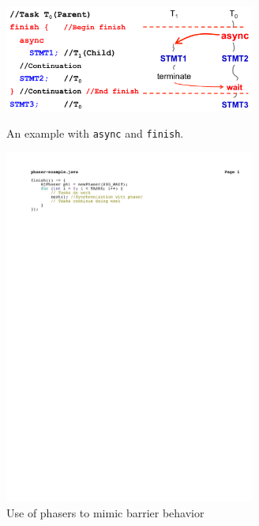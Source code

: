 \begin{figure}[t]
\cite{Cave:2011:HNA:2093157.2093165}
\centering
\includegraphics[width=3.25in]{../figs/async-finish}
\caption{An example with {\tt async} and {\tt finish}.}
\label{fig:async-finish}
\end{figure}

\begin{figure}[t]
\centering
\includegraphics[width=3.25in]{../figs/phaser-example}
\caption{Use of phasers to mimic barrier behavior}
\label{fig:phaser-example}
\end{figure}

